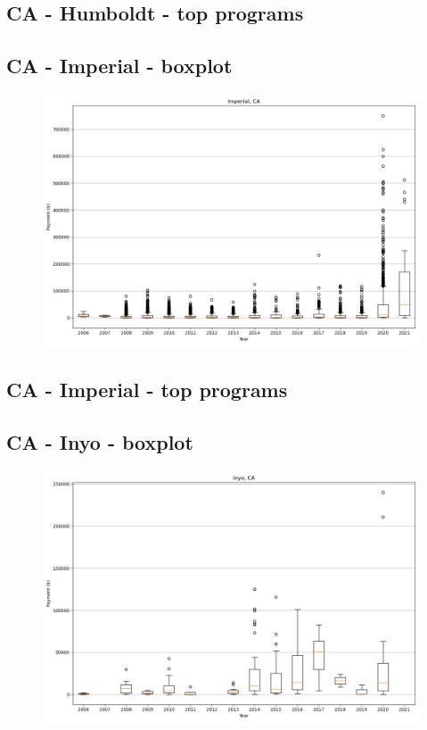 \subsection*{CA - Humboldt - top programs}

\newpage
\subsection*{CA - Imperial - boxplot}
\begin{figure}[h]
\centering
\includegraphics[width=7in]{../output/boxplots/counties/Imperial-CA_boxplot.png}
\end{figure}


\subsection*{CA - Imperial - top programs}

\newpage
\subsection*{CA - Inyo - boxplot}
\begin{figure}[h]
\centering
\includegraphics[width=7in]{../output/boxplots/counties/Inyo-CA_boxplot.png}
\end{figure}


